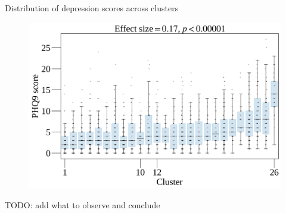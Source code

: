\documentclass[handout,10pt]{beamer}
\begin{document}
\begin{frame}{Distribution of depression scores across clusters}
  \begin{figure}
    \centering
    \includegraphics[scale=0.06]{img/topic_modeling/boxplot_description/popgen_description_larger_boxplots.png}
    \label{fig:popgen_description}
\end{figure}

TODO: add what to observe and conclude

\end{frame}
\end{document}
